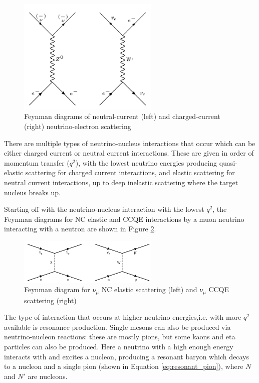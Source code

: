 \begin{figure}
    \centering
    \includegraphics[width=0.6\textwidth]{Figures/elastic_scattering.png}
    \caption{Feynman diagrams of neutral-current (left) and charged-current (right) neutrino-electron scattering}
    \label{fig:elastic_scattering}
\end{figure}

There are multiple types of neutrino-nucleus interactions that occur which can be either charged current or neutral current interactions. These are given in order of momentum transfer ($q^2$), with the lowest neutrino energies producing quasi-elastic scattering for charged current interactions, and elastic scattering for neutral current interactions, up to deep inelastic scattering where the target nucleus breaks up. 

Starting off with the neutrino-nucleus interaction with the lowest $q^2$, the Feynman diagrams for NC elastic and CCQE interactions by a muon neutrino interacting with a neutron are shown in Figure \ref{fig:ncel_ccqe}. 

\begin{figure}
    \centering
    \includegraphics[width=0.6\textwidth]{Figures/ncel_ccqe.png}
    \caption{Feynman diagram for $\nu_{\mu}$ NC elastic scattering (left) and $\nu_{\mu}$ CCQE scattering (right)}
    \label{fig:ncel_ccqe}
\end{figure}

The type of interaction that occurs at higher neutrino energies,i.e. with more $q^2$ available is resonance production. Single mesons can also be produced via neutrino-nucleon reactions: these are mostly pions, but some kaons and eta particles can also be produced. Here a neutrino with a high enough energy interacts with and excites a nucleon, producing a resonant baryon which decays to a nucleon and a single pion (shown in Equation \ref{eq:resonant_pion}), where $N$ and $N'$ are nucleons.


